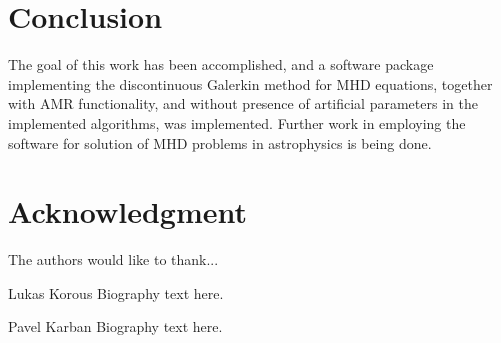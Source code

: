 \documentclass[journal,transmag]{IEEEtran}
\begin{document}
\section{Conclusion}
The goal of this work has been accomplished, and a software package implementing the discontinuous Galerkin method for MHD equations, together with AMR functionality, and without presence of artificial parameters in the implemented algorithms, was implemented. Further work in employing the software for solution of MHD problems in astrophysics is being done.

\section*{Acknowledgment}
The authors would like to thank...


\ifCLASSOPTIONcaptionsoff
  \newpage
\fi

%
%
%



\begin{IEEEbiographynophoto}{Lukas Korous}
Biography text here.
\end{IEEEbiographynophoto}

\begin{IEEEbiographynophoto}{Pavel Karban}
Biography text here.
\end{IEEEbiographynophoto}
\end{document}
